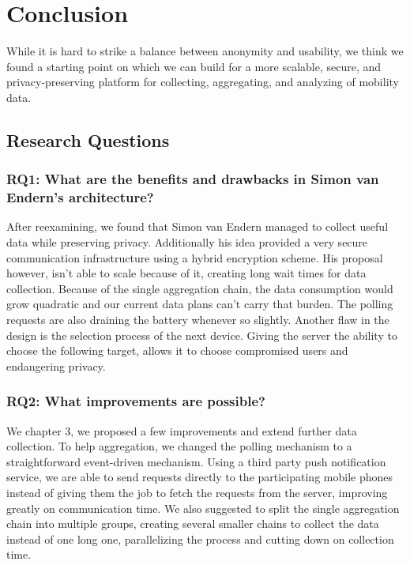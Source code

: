 
\chapter{Conclusion}\label{chapter:conclusion}
While it is hard to strike a balance between anonymity and usability, we think we found a starting point on which we can build for a more scalable, secure, and privacy-preserving platform for collecting, aggregating, and analyzing of mobility data.
\section{Research Questions}
\subsection*{RQ1: What are the benefits and drawbacks in Simon van Endern's architecture?}
After reexamining, we found that Simon van Endern managed to collect useful data while preserving privacy. Additionally his idea provided a very secure communication infrastructure using a hybrid encryption scheme. His proposal however, isn't able to scale because of it, creating long wait times for data collection. Because of the single aggregation chain, the data consumption would grow quadratic and our current data plans can't carry that burden. The polling requests are also draining the battery whenever so slightly.
Another flaw in the design is the selection process of the next device. Giving the server the ability to choose the following target, allows it to choose compromised users and endangering privacy. 

\subsection*{RQ2: What improvements are possible?}
We chapter 3, we proposed a few improvements and extend further data collection. To help aggregation, we changed the polling mechanism to a straightforward event-driven mechanism. Using a third party push notification service, we are able to send requests directly to the participating mobile phones instead of giving them the job to fetch the requests from the server, improving greatly on communication time. We also suggested to split the single aggregation chain into multiple groups, creating several smaller chains to collect the data instead of one long one, parallelizing the process and cutting down on collection time. 

